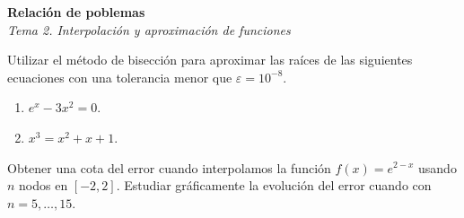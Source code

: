 \documentclass[11pt]{article}
\begin{document}

\begin{center}
  \large \textbf{Relación de poblemas} \\ [0.2em]
  \Large \textit{Tema 2. Interpolación y aproximación de funciones}
\end{center}

\medskip

\begin{problemas}
  \begin{problema}
    Utilizar el método de bisección para aproximar las raíces de las
    siguientes ecuaciones con una tolerancia menor que
    $\varepsilon=10^{-8}$.
    \begin{enumerate}
    \item $e^x-3x^2=0$.
    \item $x^3=x^2+x+1$.
    \end{enumerate}
  \end{problema}

  \begin{problema}
    Obtener una cota del error cuando interpolamos la función
    $f(x)=e^{2-x}$ usando $n$
    nodos en $[-2,2]$. Estudiar gráficamente la evolución del error
    cuando con $n=5,\dots,15$.
  \end{problema}

\end{problemas}
\end{document}
